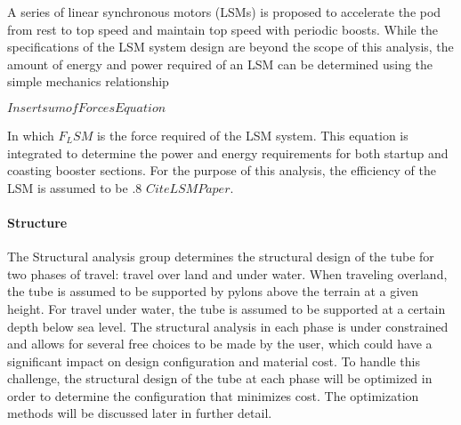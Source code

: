 A series of linear synchronous motors (LSMs) is proposed to accelerate the pod from rest to top speed and maintain top speed with periodic boosts. While the specifications of the LSM system design are beyond the scope of this analysis, the amount of energy and power required of an LSM can be determined using the simple mechanics relationship

$Insert sum of Forces Equation$

In which $F_LSM$ is the force required of the LSM system. This equation is integrated to determine the power and energy requirements for both startup and coasting booster sections. For the purpose of this analysis, the efficiency of the LSM is assumed to be .8 $Cite LSM Paper$.

\paragraph{Structure}

The Structural analysis group determines the structural design of the tube for two phases of travel: travel over land and under water. When traveling overland, the tube is assumed to be supported by pylons above the terrain at a given height. For travel under water, the tube is assumed to be supported at a certain depth below sea level. The structural analysis in each phase is under constrained and allows for several free choices to be made by the user, which could have a significant impact on design configuration and material cost. To handle this challenge, the structural design of the tube at each phase will be optimized in order to determine the configuration that minimizes cost. The optimization methods will be discussed later in further detail.

